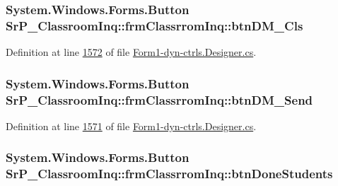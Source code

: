 \hypertarget{class_sr_p___classroom_inq_1_1frm_classrrom_inq_a2e01fdc50400702fd6df6d5d785ddb4d}{
\subsubsection[{btn\-D\-M\-\_\-\-Cls}]{\setlength{\rightskip}{0pt plus 5cm}\-System.\-Windows.\-Forms.\-Button {\bf \-Sr\-P\-\_\-\-Classroom\-Inq\-::frm\-Classrrom\-Inq\-::btn\-D\-M\-\_\-\-Cls}}}
\label{class_sr_p___classroom_inq_1_1frm_classrrom_inq_a2e01fdc50400702fd6df6d5d785ddb4d}


\-Definition at line \hyperlink{_form1-dyn-ctrls_8_designer_8cs_source_l01572}{1572} of file \hyperlink{_form1-dyn-ctrls_8_designer_8cs_source}{\-Form1-\/dyn-\/ctrls.\-Designer.\-cs}.

\hypertarget{class_sr_p___classroom_inq_1_1frm_classrrom_inq_a5633d72d43c108b34eb912acdcc81878}{
\subsubsection[{btn\-D\-M\-\_\-\-Send}]{\setlength{\rightskip}{0pt plus 5cm}\-System.\-Windows.\-Forms.\-Button {\bf \-Sr\-P\-\_\-\-Classroom\-Inq\-::frm\-Classrrom\-Inq\-::btn\-D\-M\-\_\-\-Send}}}
\label{class_sr_p___classroom_inq_1_1frm_classrrom_inq_a5633d72d43c108b34eb912acdcc81878}


\-Definition at line \hyperlink{_form1-dyn-ctrls_8_designer_8cs_source_l01571}{1571} of file \hyperlink{_form1-dyn-ctrls_8_designer_8cs_source}{\-Form1-\/dyn-\/ctrls.\-Designer.\-cs}.

\hypertarget{class_sr_p___classroom_inq_1_1frm_classrrom_inq_a9225d189a561ae3a5b9f68ca3c004351}{
\subsubsection[{btn\-Done\-Students}]{\setlength{\rightskip}{0pt plus 5cm}\-System.\-Windows.\-Forms.\-Button {\bf \-Sr\-P\-\_\-\-Classroom\-Inq\-::frm\-Classrrom\-Inq\-::btn\-Done\-Students}}}
\label{class_sr_p___classroom_inq_1_1frm_classrrom_inq_a9225d189a561ae3a5b9f68ca3c004351}


